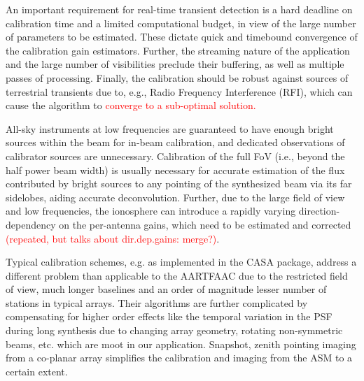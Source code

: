 \documentclass{aa}
\begin{document}
An important requirement for real-time transient detection is a hard
deadline on calibration time and a limited computational budget, in
view of the large number of parameters to be estimated. These dictate
quick and timebound convergence of the calibration gain estimators.
Further, the streaming nature of the application and the large number
of visibilities preclude their buffering, as well as multiple passes
of processing. Finally, the calibration should be robust against sources
of terrestrial transients due to, e.g., Radio Frequency Interference
(RFI), which can cause the algorithm to \textcolor{red}{converge to
a sub-optimal solution.}

All-sky instruments at low frequencies are guaranteed to have enough
bright sources within the beam for in-beam calibration, and dedicated
observations of calibrator sources are unnecessary. Calibration of
the full FoV (i.e., beyond the half power beam width) is usually necessary
for accurate estimation of the flux contributed by bright sources
to any pointing of the synthesized beam via its far sidelobes, aiding
accurate deconvolution. Further, due to the large field of view and
low frequencies, the ionosphere can introduce a rapidly varying direction-dependency
on the per-antenna gains, which need to be estimated and corrected
\textcolor{red}{(repeated, but talks about dir.dep.gains: merge?)}. 

{} Typical calibration schemes, e.g. as implemented in the CASA package,
address a different problem than applicable to the AARTFAAC due to
the restricted field of view, much longer baselines and an order of
magnitude lesser number of stations in typical arrays. Their algorithms
are further complicated by compensating for higher order effects like
the temporal variation in the PSF during long synthesis due to changing
array geometry, rotating non-symmetric beams, etc. which are moot
in our application. Snapshot, zenith pointing imaging from a co-planar
array simplifies the calibration and imaging from the ASM to a certain
extent. 
\end{document}
